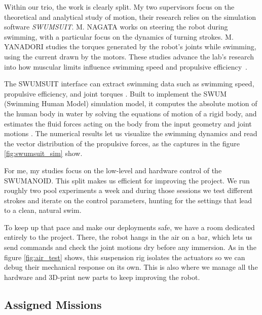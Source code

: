 \documentclass{tropLaClasse}
\begin{document}
Within our trio, the work is clearly split. My two supervisors focus on the theoretical and analytical study of motion, their research relies on the simulation software \textit{SWUMSUIT}. M. NAGATA works on steering the robot during swimming, with a particular focus on the dynamics of turning strokes. M. YANADORI studies the torques generated by the robot's joints while swimming, using the current drawn by the motors. These studies advance the lab's research into how muscular limits influence swimming speed and propulsive efficiency~\cite{nakashima2012optimizing}.

The SWUMSUIT interface can extract swimming data such as swimming speed, propulsive efficiency, and joint torques \cite{swumsuit2005}. Built to implement the SWUM (Swimming Human Model) simulation model, it computes the absolute motion of the human body in water by solving the equations of motion of a rigid body, and estimates the fluid forces acting on the body from the input geometry and joint motions \cite{swumsuit2005}. The numerical results let us visualize the swimming dynamics and read the vector distribution of the propulsive forces, as the captures in the figure \ref{fig:swumsuit_sim} show. \label{text:swumsuit_sim}


For me, my studies focus on the low-level and hardware control of the SWUMANOID. This split makes us efficient for improving the project. We run roughly two pool experiments a week and during those sessions we test different strokes and iterate on the control parameters, hunting for the settings that lead to a clean, natural swim.

To keep up that pace and make our deployments safe, we have a room dedicated entirely to the project. There, the robot hangs in the air on a bar, which lets us send commands and check the joint motions dry before any immersion. As in the figure \ref{fig:air_test} shows, this suspension rig isolates the actuators so we can debug their mechanical response on its own. This is also where we manage all the hardware and 3D-print new parts to keep improving the robot. \label{text:air_test}



\subsection{Assigned Missions}
\end{document}
